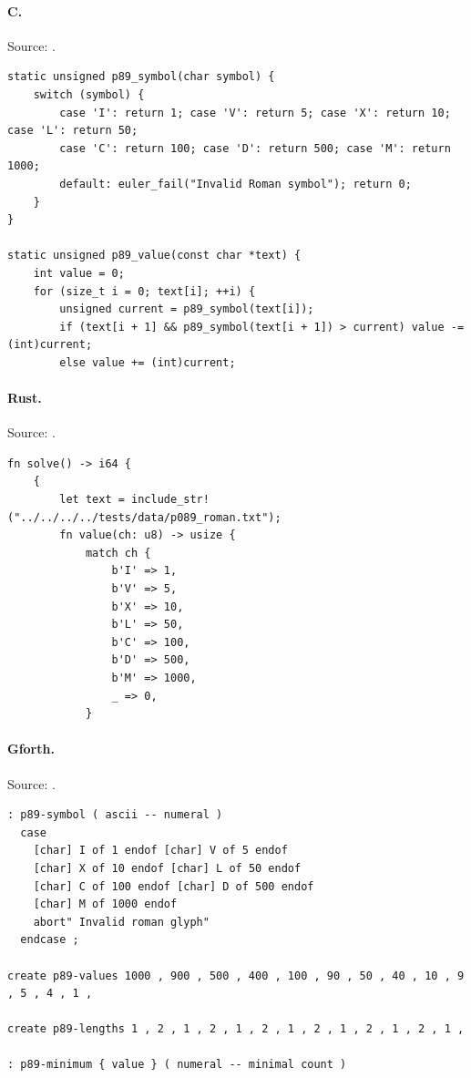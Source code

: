 \paragraph{C.} Source: .
\begin{lstlisting}
static unsigned p89_symbol(char symbol) {
    switch (symbol) {
        case 'I': return 1; case 'V': return 5; case 'X': return 10; case 'L': return 50;
        case 'C': return 100; case 'D': return 500; case 'M': return 1000;
        default: euler_fail("Invalid Roman symbol"); return 0;
    }
}

static unsigned p89_value(const char *text) {
    int value = 0;
    for (size_t i = 0; text[i]; ++i) {
        unsigned current = p89_symbol(text[i]);
        if (text[i + 1] && p89_symbol(text[i + 1]) > current) value -= (int)current;
        else value += (int)current;
\end{lstlisting}

\paragraph{Rust.} Source: .
\begin{lstlisting}
fn solve() -> i64 {
    {
        let text = include_str!("../../../../tests/data/p089_roman.txt");
        fn value(ch: u8) -> usize {
            match ch {
                b'I' => 1,
                b'V' => 5,
                b'X' => 10,
                b'L' => 50,
                b'C' => 100,
                b'D' => 500,
                b'M' => 1000,
                _ => 0,
            }
\end{lstlisting}

\paragraph{Gforth.} Source: .
\begin{lstlisting}
: p89-symbol ( ascii -- numeral )
  case
    [char] I of 1 endof [char] V of 5 endof
    [char] X of 10 endof [char] L of 50 endof
    [char] C of 100 endof [char] D of 500 endof
    [char] M of 1000 endof
    abort" Invalid roman glyph"
  endcase ;

create p89-values 1000 , 900 , 500 , 400 , 100 , 90 , 50 , 40 , 10 , 9 , 5 , 4 , 1 ,

create p89-lengths 1 , 2 , 1 , 2 , 1 , 2 , 1 , 2 , 1 , 2 , 1 , 2 , 1 ,

: p89-minimum { value } ( numeral -- minimal count )
\end{lstlisting}

